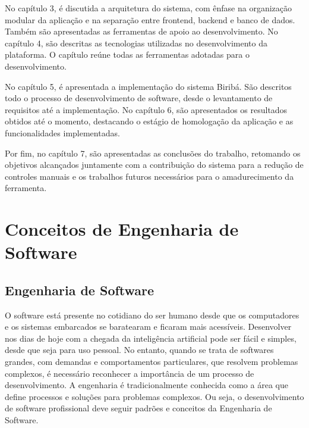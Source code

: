 \documentclass[grad,pdftex]{poli}
\begin{document}
No capítulo 3, é discutida a arquitetura do sistema, com ênfase na organização modular da aplicação e na separação entre frontend, backend e banco de dados. Também são apresentadas as ferramentas de apoio ao desenvolvimento. No capítulo 4, são descritas as tecnologias utilizadas no desenvolvimento da plataforma. O capítulo reúne todas as ferramentas adotadas para o desenvolvimento.

No capítulo 5, é apresentada a implementação do sistema Biribá. São descritos todo o processo de desenvolvimento de software, desde o levantamento de requisitos até a implementação. No capítulo 6, são apresentados os resultados obtidos até o momento, destacando o estágio de homologação da aplicação e as funcionalidades implementadas.

Por fim, no capítulo 7, são apresentadas as conclusões do trabalho, retomando os objetivos alcançados juntamente com a contribuição do sistema para a redução de controles manuais e os trabalhos futuros necessários para o amadurecimento da ferramenta.
\clearpage{}
    \clearpage{}\chapter{Conceitos de Engenharia de Software}
\label{chap3}

\section{Engenharia de Software}

O software está presente no cotidiano do ser humano desde que os computadores e os sistemas embarcados se baratearam e ficaram mais acessíveis. Desenvolver nos dias de hoje com a chegada da inteligência artificial pode ser fácil e simples, desde que seja para uso pessoal. No entanto, quando se trata de softwares grandes, com demandas e comportamentos particulares, que resolvem problemas complexos, é necessário reconhecer a importância de um processo de desenvolvimento. A engenharia é tradicionalmente conhecida como a área que define processos e soluções para problemas complexos. Ou seja, o desenvolvimento de software profissional deve seguir padrões e conceitos da Engenharia de Software.
\end{document}
